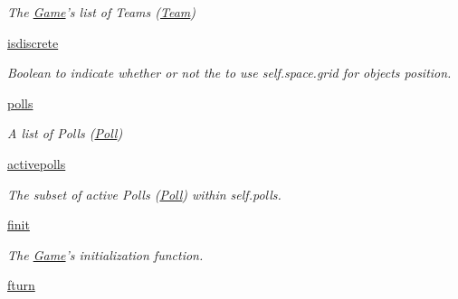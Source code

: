 \begin{DoxyCompactItemize}
\begin{DoxyCompactList}\small\item\em \-The \hyperlink{classGame_1_1Game}{\-Game}'s list of \-Teams (\hyperlink{namespaceTeam}{\-Team}) \end{DoxyCompactList}\item 
\hypertarget{classGame_1_1Game_ae533135b459d1563769361e0022af7da}{\hyperlink{classGame_1_1Game_ae533135b459d1563769361e0022af7da}{isdiscrete}}\label{classGame_1_1Game_ae533135b459d1563769361e0022af7da}

\begin{DoxyCompactList}\small\item\em \-Boolean to indicate whether or not the to use self.\-space.\-grid for objects position. \end{DoxyCompactList}\item 
\hypertarget{classGame_1_1Game_ab9913d7afe86cddc153b9a299823dcb2}{\hyperlink{classGame_1_1Game_ab9913d7afe86cddc153b9a299823dcb2}{polls}}\label{classGame_1_1Game_ab9913d7afe86cddc153b9a299823dcb2}

\begin{DoxyCompactList}\small\item\em \-A list of \-Polls (\hyperlink{classGame_1_1Poll}{\-Poll}) \end{DoxyCompactList}\item 
\hypertarget{classGame_1_1Game_a6e7630196dde4954d8915a58a1557b00}{\hyperlink{classGame_1_1Game_a6e7630196dde4954d8915a58a1557b00}{activepolls}}\label{classGame_1_1Game_a6e7630196dde4954d8915a58a1557b00}

\begin{DoxyCompactList}\small\item\em \-The subset of active \-Polls (\hyperlink{classGame_1_1Poll}{\-Poll}) within self.\-polls. \end{DoxyCompactList}\item 
\hypertarget{classGame_1_1Game_ae8fd4be17b48fb5a5d68146cb092e4fb}{\hyperlink{classGame_1_1Game_ae8fd4be17b48fb5a5d68146cb092e4fb}{finit}}\label{classGame_1_1Game_ae8fd4be17b48fb5a5d68146cb092e4fb}

\begin{DoxyCompactList}\small\item\em \-The \hyperlink{classGame_1_1Game}{\-Game}'s initialization function. \end{DoxyCompactList}\item 
\hypertarget{classGame_1_1Game_ad0fa73cb5206c668d9916ea6e4d50478}{\hyperlink{classGame_1_1Game_ad0fa73cb5206c668d9916ea6e4d50478}{fturn}}\label{classGame_1_1Game_ad0fa73cb5206c668d9916ea6e4d50478}


\end{DoxyCompactItemize}
